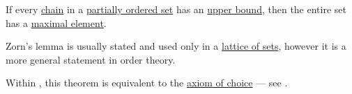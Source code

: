 \begin{lemma}\label{thm:zorns_lemma}
  If every \hyperref[def:partially_ordered_set_chain_and_antichain]{chain} in a \hyperref[def:partially_ordered_set]{partially ordered set} has an \hyperref[def:partially_ordered_set_extremal_points/upper_and_lower_bounds]{upper bound}, then the entire set has a \hyperref[def:partially_ordered_set_extremal_points/maximal_and_minimal_element]{maximal element}.

  Zorn's lemma is usually stated and used only in a \hyperref[thm:boolean_algebra_of_subsets]{lattice of sets}, however it is a more general statement in order theory.

  Within \hyperref[def:zfc]{}, this theorem is equivalent to the \hyperref[def:zfc/choice]{axiom of choice} --- see .
\end{lemma}

